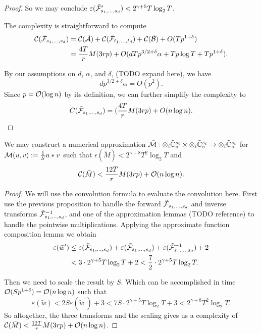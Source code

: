 \begin{proof}
    So we may conclude $\varepsilon(\tilde{\mathcal F}_{s_1, \ldots, s_d}^\prime) < 2^{\gamma + 5}T\log_2 T$.

    The complexity is straightforward to compute
    \begin{align*}
        \mathcal C(\tilde{\mathcal F}_{s_1, \ldots, s_d}) &= \mathcal C(\tilde{\mathcal A}) + \mathcal C(\tilde{\mathcal F}_{t_1, \ldots, t_d}) + \mathcal C(\tilde{\mathcal B}) + O(Tp^{1 + \delta})\\
                                                &= \frac{4T}{r}M(3rp) + O(dTp^{3/2 + \delta}\alpha + Tp\log T + Tp^{1 + \delta}).
    \end{align*}

    By our assumptions on $d$, $\alpha$, and $\delta$, (TODO expand here), we have
    \[
        dp^{3/2 + \delta}\alpha = O(p^2).
    \]
    Since $p = \mathcal O(\log n)$ by its definition, we can further simplify the complexity to
    \[
        C(\tilde{\mathcal F}_{s_1, \ldots, s_d}) = (\frac{4T}{r}M(3rp) + O(n \log n).
    \]
\end{proof}

\begin{proposition}
    We may construct a numerical approximation $\tilde{\mathcal M}: \otimes_i \tilde{{\mathbb C}}_\circ^{s_i} \times \otimes_i \tilde{{\mathbb C}}_\circ^{s_i} \to \otimes_i \tilde{{\mathbb C}}_\circ^{s_i}$ for $\mathcal M(u, v) := \frac{1}{S}u \ast v$ such that $\epsilon(\tilde{M}) < 2^{\gamma + 8}T^2 \log_2T$ and
    \[
        \mathcal C(\tilde{M}) < \frac{12T}{r} M(3rp) + \mathcal O(n \log n).
    \]
\end{proposition}

\begin{proof}
    We will use the convolution formula to evaluate the convolution here. First use the previous proposition to handle the forward $\tilde{\mathcal F}_{s_1, \ldots, s_d}$ and inverse transforms $\tilde{\mathcal F}_{s_1, \ldots, s_d}^{-1}$, and one of the approximation lemmas (TODO reference) to handle the pointwise multiplications. Applying the approximate function composition lemma we obtain
    \begin{align*}
        \varepsilon(\tilde{w}^\prime) &\leq \varepsilon(\tilde{\mathcal F}_{s_1, \ldots, s_d}) + \varepsilon(\tilde{\mathcal F}_{s_1, \ldots, s_d}) + \varepsilon(\tilde{\mathcal F}^{-1}_{s_1, \ldots, s_d}) + 2\\
                                      &< 3 \cdot 2^{\gamma + 5}T\log_2 T + 2 < \frac{7}{2} \cdot 2^{\gamma + 5}T \log_2 T.
    \end{align*}

    Then we need to scale the result by $S$. Which can be accomplished in time $\mathcal O(Sp^{1 + \delta}) = \mathcal O(n \log n)$ such that
    \[
        \varepsilon(\tilde{w}) < 2S\varepsilon(\tilde{w}^\prime) + 3 < 7S \cdot 2^{\gamma + 5} T \log_2 T + 3 < 2^{\gamma + 8}T^2 \log_2 T.
    \]
    So altogether, the three transforms and the scaling gives us a complexity of $\mathcal C(\tilde{M}) < \frac{12T}{r} M(3rp) + \mathcal O(n \log n)$.
\end{proof}


